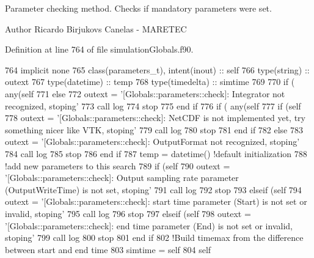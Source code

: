 Parameter checking method. Checks if mandatory parameters were set. 

\begin{DoxyAuthor}{Author}
Ricardo Birjukovs Canelas -\/ M\+A\+R\+E\+T\+EC 
\end{DoxyAuthor}


Definition at line 764 of file simulation\+Globals.\+f90.


\begin{DoxyCode}
764     \textcolor{keywordtype}{implicit none}
765     \textcolor{keywordtype}{class}(parameters\_t), \textcolor{keywordtype}{intent(inout)} :: self
766     \textcolor{keywordtype}{type}(string) :: outext
767     \textcolor{keywordtype}{type}(datetime) :: temp
768     \textcolor{keywordtype}{type}(timedelta) :: simtime
769 
770     \textcolor{keywordflow}{if} ( any(self%
771     \textcolor{keywordflow}{else}
772         outext = \textcolor{stringliteral}{'[Globals::parameters::check]: Integrator not recognized, stoping'}
773         \textcolor{keyword}{call }log%
774         stop
775 \textcolor{keywordflow}{    end if}
776     \textcolor{keywordflow}{if} ( any(self%
777         \textcolor{keywordflow}{if} (self%
778             outext = \textcolor{stringliteral}{'[Globals::parameters::check]: NetCDF is not implemented yet, try something nicer like
       VTK, stoping'}
779             \textcolor{keyword}{call }log%
780             stop
781 \textcolor{keywordflow}{        end if}
782     \textcolor{keywordflow}{else}
783         outext = \textcolor{stringliteral}{'[Globals::parameters::check]: OutputFormat not recognized, stoping'}
784         \textcolor{keyword}{call }log%
785         stop
786 \textcolor{keywordflow}{    end if}
787     temp = datetime() \textcolor{comment}{!default initialization}
788     \textcolor{comment}{!add new parameters to this search}
789     \textcolor{keywordflow}{if} (self%
790         outext = \textcolor{stringliteral}{'[Globals::parameters::check]: Output sampling rate parameter (OutputWriteTime) is not
       set, stoping'}
791         \textcolor{keyword}{call }log%
792         stop
793     \textcolor{keywordflow}{elseif} (self%
794         outext = \textcolor{stringliteral}{'[Globals::parameters::check]: start time parameter (Start) is not set or invalid,
       stoping'}
795         \textcolor{keyword}{call }log%
796         stop
797     \textcolor{keywordflow}{elseif} (self%
798         outext = \textcolor{stringliteral}{'[Globals::parameters::check]: end time parameter (End) is not set or invalid, stoping'}
799         \textcolor{keyword}{call }log%
800         stop
801 \textcolor{keywordflow}{    end if}
802     \textcolor{comment}{!Build timemax from the difference between start and end time}
803     simtime = self%
804     self%
\end{DoxyCode}

